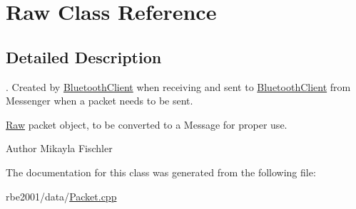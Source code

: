 \hypertarget{class_raw}{}\section{Raw Class Reference}
\label{class_raw}


\subsection{Detailed Description}
. Created by \hyperlink{class_bluetooth_client}{Bluetooth\+Client} when receiving and sent to \hyperlink{class_bluetooth_client}{Bluetooth\+Client} from Messenger when a packet needs to be sent.

\hyperlink{class_raw}{Raw} packet object, to be converted to a Message for proper use. \begin{DoxyAuthor}{Author}
Mikayla Fischler 
\end{DoxyAuthor}


The documentation for this class was generated from the following file\+:\begin{DoxyCompactItemize}
\item 
rbe2001/data/\hyperlink{_packet_8cpp}{Packet.\+cpp}\end{DoxyCompactItemize}
